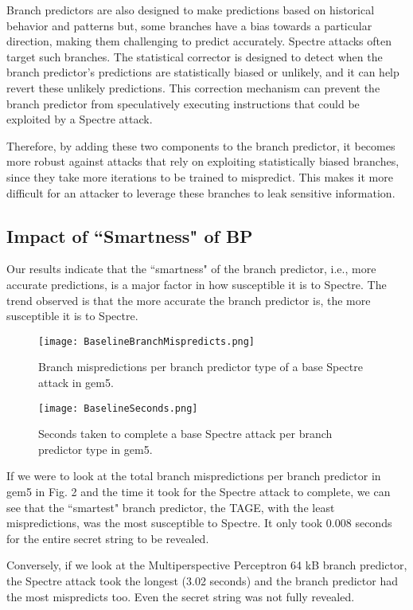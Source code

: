 \documentclass[twocolumn,showpacs,%
  nofootinbib,aps,superscriptaddress,%
  eqsecnum,prd,notitlepage,showkeys,10pt]{revtex4-1}
\begin{document}
Branch predictors are also designed to make predictions based on historical behavior and patterns but, some branches have a bias towards a particular direction, making them challenging to predict accurately. Spectre attacks often target such branches. The statistical corrector is designed to detect when the branch predictor's predictions are statistically biased or unlikely, and it can help revert these unlikely predictions. This correction mechanism can prevent the branch predictor from speculatively executing instructions that could be exploited by a Spectre attack.

Therefore, by adding these two components to the branch predictor, it becomes more robust against attacks that rely on exploiting statistically biased branches, since they take more iterations to be trained to mispredict. This makes it more difficult for an attacker to leverage these branches to leak sensitive information.

\subsection{Impact of ``Smartness" of BP}

Our results indicate that the ``smartness" of the branch predictor, i.e., more accurate predictions, is a major factor in how susceptible it is to Spectre. The trend observed is that the more accurate the branch predictor is, the more susceptible it is to Spectre.

\begin{figure}
    \centering
    \texttt{[image: BaselineBranchMispredicts.png]}
    \caption{Branch mispredictions per branch predictor type of a base Spectre attack in gem5.}
\end{figure}

\begin{figure}
    \centering
    \texttt{[image: BaselineSeconds.png]}
    \caption{Seconds taken to complete a base Spectre attack per branch predictor type in gem5.}
\end{figure}

If we were to look at the total branch mispredictions per branch predictor in gem5 in Fig. 2 and the time it took for the Spectre attack to complete, we can see that the ``smartest" branch predictor, the TAGE, with the least mispredictions, was the most susceptible to Spectre. It only took 0.008 seconds for the entire secret string to be revealed.

Conversely, if we look at the Multiperspective Perceptron 64 kB branch predictor, the Spectre attack took the longest (3.02 seconds) and the branch predictor had the most mispredicts too. Even the secret string was not fully revealed.
\end{document}

